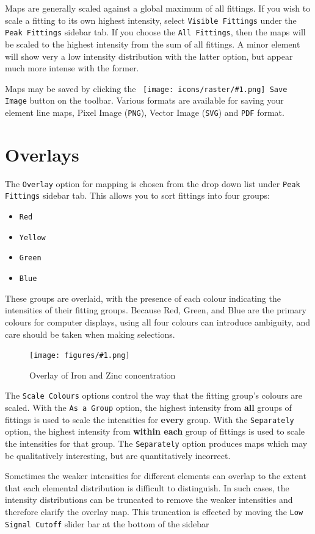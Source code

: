 \documentclass[article,twoside,11pt]{report}
\newcommand{\command}[1]{\texttt{#1}}
\newcommand{\icon}[1]{\texttt{[image: icons/raster/\#1.png]}}
\newcommand{\button}[2]{\ \command{\icon{#1} #2}}
\newcommand{\emphasis}[1]{{\bf #1}}
\newcommand{\screenshot}[2]{%
\begin{figure}[h!]
\centering\texttt{[image: figures/\#1.png]}
\caption{#2}
\end{figure}
}
\newcommand{\tocsection}[1]{\section*{#1}\addcontentsline{toc}{section}{#1}}
\begin{document}
Maps are generally scaled against a global maximum of all fittings. If you wish to scale a fitting to its own highest intensity, select \command{Visible Fittings} under the \command{Peak Fittings} sidebar tab. If you choose the \command{All Fittings}, then the maps will be scaled to the highest intensity from the sum of all fittings. A minor element will show very a low intensity distribution with the latter option, but appear much more intense with the former.

Maps may be saved by clicking the \button{device-camera}{Save Image} button on the toolbar. Various formats are available for saving your element line maps, Pixel Image (\command{PNG}), Vector Image (\command{SVG}) and \command{PDF} format.


\tocsection{Overlays}

The \command{Overlay} option for mapping is chosen from the drop down list under \command{Peak Fittings} sidebar tab. This allows you to sort fittings into four groups: 

\begin{itemize}[topsep=4pt,itemsep=1pt,partopsep=0pt, parsep=0pt]
\item \command{Red}
\item \command{Yellow}
\item \command{Green}
\item \command{Blue}
\end{itemize}

These groups are overlaid, with the presence of each colour indicating the intensities of their fitting groups. Because Red, Green, and Blue are the primary colours for computer displays, using all four colours can introduce ambiguity, and care should be taken when making selections.

\screenshot{map-overlay}{Overlay of Iron and Zinc concentration}

The \command{Scale Colours} options control the way that the fitting group's colours are scaled. With the \command{As a Group} option, the highest intensity from \emphasis{all} groups of fittings is used to scale the intensities for \emphasis{every} group. With the \command{Separately} option, the highest intensity from \emphasis{within each} group of fittings is used to scale the intensities for that group. The \command{Separately} option produces maps which may be qualitatively interesting, but are quantitatively 
incorrect.

Sometimes the weaker intensities for different elements can overlap to the extent that each elemental distribution is difficult to distinguish. In such cases, the intensity distributions can be truncated to remove the weaker intensities and therefore clarify the overlay map. This truncation is effected by moving the \command{Low Signal Cutoff} slider bar at the bottom of the sidebar
\end{document}
